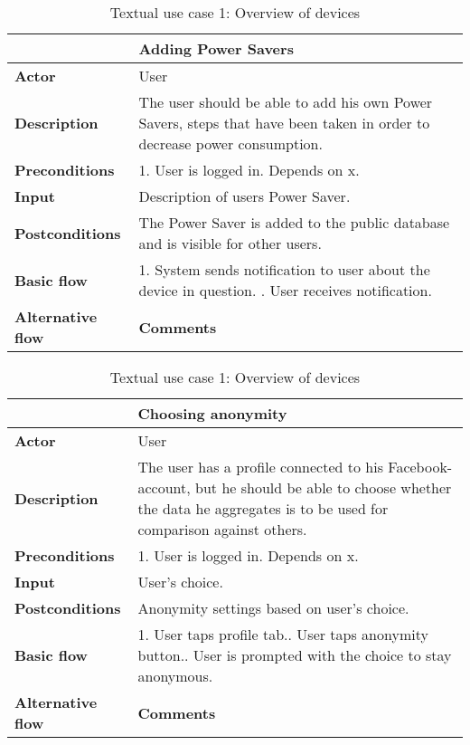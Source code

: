 \begin{table}[H]
\begin{tabular}{|l|p{12cm}|}
\hline
&\textbf{Adding Power Savers}
\\\hline
\textbf{Actor} &User
\\\hline
\textbf{Description}&
The user should be able to add his own Power Savers, steps that have been taken in order to decrease power consumption.\\\hline
\textbf{Preconditions}&
1. User is logged in.\newline
Depends on x.\\\hline
\textbf{Input}&
Description of users Power Saver.
\\\hline
\textbf{Postconditions}& 
The Power Saver is added to the public database and is visible for other users.
\\\hline
\textbf{Basic flow}&
1. System sends notification to user about the device in question. \newline
2. User receives notification.\newline
\\\hline
\textbf{Alternative flow}&

\textbf{Comments}& \\\hline
\end{tabular}
\caption{Textual use case 1: Overview of devices}
\end{table}


\begin{table}[H]
\begin{tabular}{|l|p{12cm}|}
\hline
&\textbf{Choosing anonymity}
\\\hline
\textbf{Actor} &User
\\\hline
\textbf{Description}&
The user has a profile connected to his Facebook-account, but he should be able to choose whether the data he aggregates is to be used for comparison against others.\\\hline
\textbf{Preconditions}&
1. User is logged in.\newline
Depends on x.\\\hline
\textbf{Input}&
User's choice.
\\\hline
\textbf{Postconditions}& 
Anonymity settings based on user's choice.
\\\hline
\textbf{Basic flow}&
1. User taps profile tab.\newline
2. User taps anonymity button.\newline
3. User is prompted with the choice to stay anonymous.\newline
\\\hline
\textbf{Alternative flow}&

\textbf{Comments}& \\\hline
\end{tabular}
\caption{Textual use case 1: Overview of devices}
\end{table}




